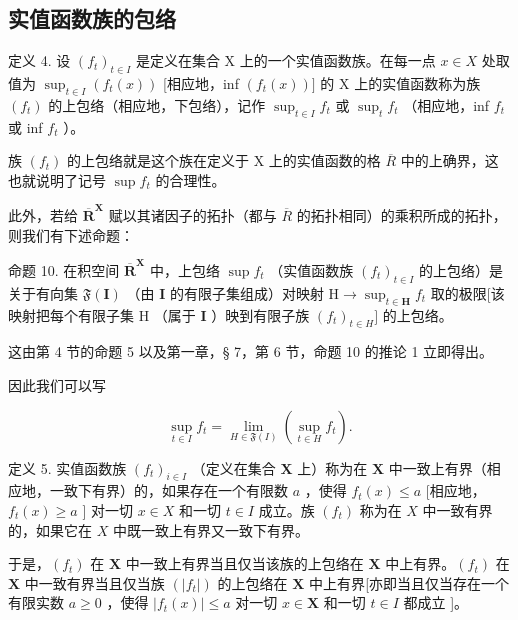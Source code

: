 \subsection{实值函数族的包络}

定义 4. 设 \((f_{t})_{t\in I}\) 是定义在集合 X 上的一个实值函数族。在每一点 \(x\in X\) 处取值为 \(\sup_{t\in I}(f_t(x))\) {[}相应地，inf \((f_t(x))]\) 的 X 上的实值函数称为族 \((f_t)\) 的上包络（相应地，下包络），记作 \(\sup_{t\in I}f_{t}\) 或 \(\sup_{t}f_{t}\) （相应地，inf \(f_{t}\) 或 inf \(f_{t}\) ）。

族 \((f_{t})\) 的上包络就是这个族在定义于 X 上的实值函数的格 \(\overline{R}\) 中的上确界，这也就说明了记号 \(\sup f_{t}\) 的合理性。

此外，若给 \(\overline{\mathbf{R}}^{\mathbf{X}}\) 赋以其诸因子的拓扑（都与 \(\overline{R}\) 的拓扑相同）的乘积所成的拓扑，则我们有下述命题：

命题 10. 在积空间 \(\overline{\mathbf{R}}^{\mathbf{X}}\) 中，上包络 \(\sup f_{t}\) （实值函数族 \((f_{t})_{t\in I}\) 的上包络）是关于有向集 \(\mathfrak{F}(\mathbf{I})\) （由 \(\mathbf{I}\) 的有限子集组成）对映射 \(\mathrm{H}\to \sup_{t\in \mathbf{H}}f_t\) 取的极限{[}该映射把每个有限子集 \(\mathrm{H}\) （属于 \(\mathbf{I}\) ）映到有限子族 \((f_{t})_{t\in H}]\) 的上包络。

这由第 4 节的命题 5 以及第一章，§ 7，第 6 节，命题 10 的推论 1 立即得出。

因此我们可以写

\[
\sup _ {t \in I} f _ {t} = \lim _ {H \in \mathfrak {F} (I)} \left(\sup _ {t \in H} f _ {t}\right).\tag{9}
\]

定义 5. 实值函数族 \((f_t)_{i\in I}\) （定义在集合 \(\mathbf{X}\) 上）称为在 \(\mathbf{X}\) 中一致上有界（相应地，一致下有界）的，如果存在一个有限数 \(a\) ，使得 \(f_{t}(x) \leqslant a\) {[}相应地，\(f_{t}(x) \geqslant a\) {]} 对一切 \(x \in X\) 和一切 \(t \in I\) 成立。族 \((f_{t})\) 称为在 \(X\) 中一致有界的，如果它在 \(X\) 中既一致上有界又一致下有界。

于是，\((f_{t})\) 在 \(\mathbf{X}\) 中一致上有界当且仅当该族的上包络在 \(\mathbf{X}\) 中上有界。\((f_{t})\) 在 \(\mathbf{X}\) 中一致有界当且仅当族 \((|f_{t}|)\) 的上包络在 \(\mathbf{X}\) 中上有界{[}亦即当且仅当存在一个有限实数 \(a \geqslant 0\) ，使得 \(|f_{t}(x)| \leqslant a\) 对一切 \(x \in \mathbf{X}\) 和一切 \(t \in I\) 都成立 {]}。

